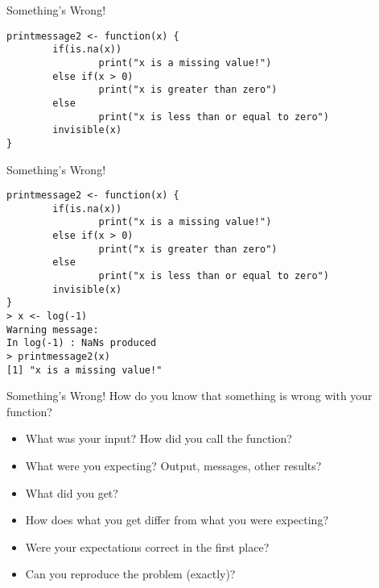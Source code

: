 \documentclass[aspectratio=169]{beamer}
\begin{document}
\begin{frame}[fragile]{Something's Wrong!}
\begin{verbatim}
printmessage2 <- function(x) {
        if(is.na(x))
                print("x is a missing value!")
        else if(x > 0)
                print("x is greater than zero")
        else 
                print("x is less than or equal to zero")
        invisible(x)
}
\end{verbatim}
\end{frame}

\begin{frame}[fragile]{Something's Wrong!}
\begin{verbatim}
printmessage2 <- function(x) {
        if(is.na(x))
                print("x is a missing value!")
        else if(x > 0)
                print("x is greater than zero")
        else 
                print("x is less than or equal to zero")
        invisible(x)
}
> x <- log(-1)
Warning message:
In log(-1) : NaNs produced
> printmessage2(x)
[1] "x is a missing value!"
\end{verbatim}
\end{frame}

\begin{frame}{Something's Wrong!}
How do you know that something is wrong with your function?
\begin{itemize}
\item What was your input? How did you call the function?
\item What were you expecting? Output, messages, other results?
\item What did you get?
\item How does what you get differ from what you were expecting?
\item Were your expectations correct in the first place?
\item Can you reproduce the problem (exactly)?
\end{itemize}
\end{frame}
\end{document}
